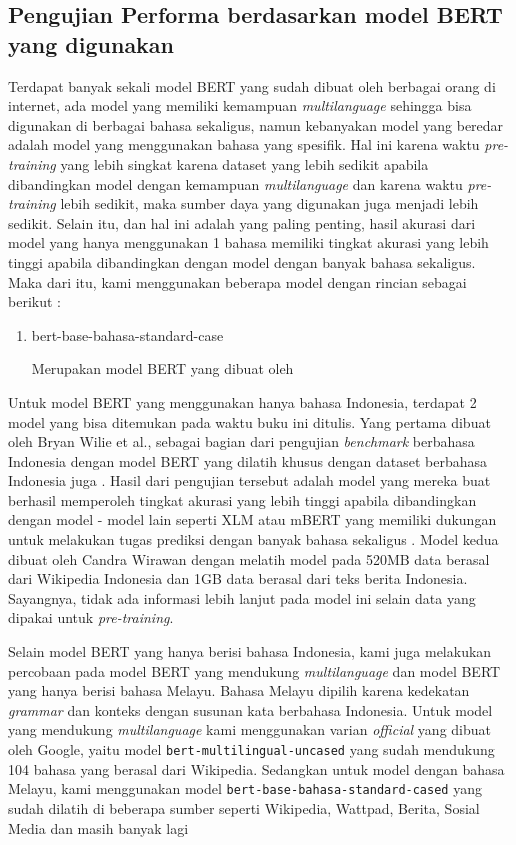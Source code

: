 \subsection{Pengujian Performa berdasarkan model BERT yang digunakan}

Terdapat banyak sekali model BERT yang sudah dibuat oleh berbagai orang di internet, ada model yang memiliki kemampuan \textit{multilanguage} sehingga bisa digunakan di berbagai bahasa sekaligus, namun kebanyakan model yang beredar adalah model yang menggunakan bahasa yang spesifik. Hal ini karena waktu \textit{pre-training} yang lebih singkat karena dataset yang lebih sedikit apabila dibandingkan model dengan kemampuan \textit{multilanguage} dan karena waktu \textit{pre-training} lebih sedikit, maka sumber daya yang digunakan juga menjadi lebih sedikit. Selain itu, dan hal ini adalah yang paling penting, hasil akurasi dari model yang hanya menggunakan 1 bahasa memiliki tingkat akurasi yang lebih tinggi apabila dibandingkan dengan model dengan banyak bahasa sekaligus. Maka dari itu, kami menggunakan beberapa model dengan rincian sebagai berikut :

\begin{enumerate}
    \item bert-base-bahasa-standard-case

          Merupakan model BERT yang dibuat oleh

\end{enumerate}

Untuk model BERT yang menggunakan hanya bahasa Indonesia, terdapat 2 model yang bisa ditemukan pada waktu buku ini ditulis. Yang pertama dibuat oleh Bryan Wilie et al., sebagai bagian dari pengujian \textit{benchmark} berbahasa Indonesia dengan model BERT yang dilatih khusus dengan dataset berbahasa Indonesia juga \cite{wilie2020indonlu}. Hasil dari pengujian tersebut adalah model yang mereka buat berhasil memperoleh tingkat akurasi yang lebih tinggi apabila dibandingkan dengan model - model lain seperti XLM atau mBERT yang memiliki dukungan untuk melakukan tugas prediksi dengan banyak bahasa sekaligus \cite{wilie2020indonlu}. Model kedua dibuat oleh Candra Wirawan dengan melatih model pada 520MB data berasal dari Wikipedia Indonesia dan 1GB data berasal dari teks berita Indonesia. Sayangnya, tidak ada informasi lebih lanjut pada model ini selain data yang dipakai untuk \textit{pre-training}.

Selain model BERT yang hanya berisi bahasa Indonesia, kami juga melakukan percobaan pada model BERT yang mendukung \textit{multilanguage} dan model BERT yang hanya berisi bahasa Melayu. Bahasa Melayu dipilih karena kedekatan \textit{grammar} dan konteks dengan susunan kata berbahasa Indonesia. Untuk model yang mendukung \textit{multilanguage} kami menggunakan varian \textit{official} yang dibuat oleh Google, yaitu model \texttt{bert-multilingual-uncased} yang sudah mendukung 104 bahasa yang berasal dari Wikipedia. Sedangkan untuk model dengan bahasa Melayu, kami menggunakan model \texttt{bert-base-bahasa-standard-cased} yang sudah dilatih di beberapa sumber seperti Wikipedia, Wattpad, Berita, Sosial Media dan masih banyak lagi \cite{Malaya}

